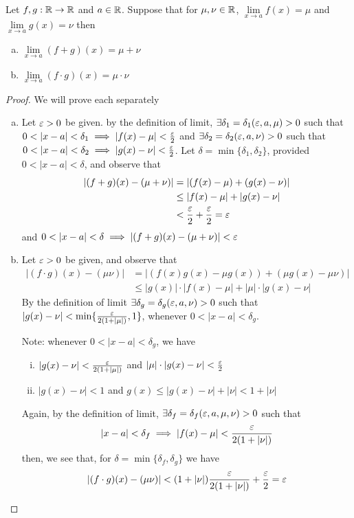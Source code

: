 \begin{theorem}
    Let $f, g:\mathbb R \rightarrow \mathbb R$ and $a \in \mathbb R$.
    Suppose that for $\mu, \nu \in \mathbb R$, $\lim\limits_{x \to a} f(x) = \mu$ and $\lim\limits_{x \to a} g(x) = \nu$ then \begin{enumerate}[(a)]
        \item $\lim\limits_{x \to a} (f+g)(x) = \mu + \nu$
        \item$\lim\limits_{x \to a} (f\cdot g)(x) = \mu \cdot \nu$
    \end{enumerate}
\end{theorem}
\begin{proof}
We will prove each separately
\begin{enumerate}[(a)]
    \item Let $\varepsilon > 0$ be given. by the definition of limit,  
    $\exists \delta_1 = \delta_1(\varepsilon, a, \mu) > 0$ such that 
    $0 < |x - a| < \delta_1 \implies |f(x) - \mu| < \frac{\varepsilon}{2}$ and 
    $\exists \delta_2 = \delta_2(\varepsilon, a, \nu) > 0$ such that 
    $0 < |x - a| < \delta_2 \implies |g(x) - \nu| < \frac{\varepsilon}{2}$.
    Let $\delta=\min\{\delta_1, \delta_2\}$, provided $0 < |x-a| < \delta$, and observe that
    \begin{align*}
        |(f+g)(x)-(\mu+\nu)| &= |(f(x)-\mu)+(g(x)-\nu)| \\
        &\leq |f(x)-\mu|+|g(x)-\nu| \\
        &< \frac{\varepsilon}{2} + \frac{\varepsilon}{2} = \varepsilon
    \end{align*}
    and $0 < |x-a| < \delta \implies |(f+g)(x)-(\mu+\nu)| < \varepsilon$
    \item Let $\varepsilon > 0$ be given, and observe that 
    \begin{align*}
        |(f\cdot g)(x)-(\mu\nu)| &= |(f(x)g(x)-\mu g(x))+(\mu g(x)-\mu\nu)| \\
        &\leq |g(x)|\cdot|f(x)-\mu|+|\mu|\cdot|g(x)-\nu| 
    \end{align*}
    By the definition of limit $\exists \delta_g=\delta_g(\varepsilon, a, \nu) > 0$ such that $|g(x) - \nu| < \min\{\frac{\varepsilon}{2(1+|\mu|)}, 1\}$, whenever $0 < |x-a| < \delta_g$.
    
    Note: whenever $0 < |x-a| < \delta_g$, we have
    \begin{enumerate}[(i)]
        \item $|g(x) - \nu| < \frac{\varepsilon}{2(1+|\mu|)}$ and $|\mu|\cdot|g(x)-\nu| < \frac{\varepsilon}{2}$
        \item $|g(x)-\nu| < 1$ and $g(x) \leq |g(x) - \nu| + |\nu| < 1 + |\nu|$
    \end{enumerate}
    Again, by the definition of limit, $\exists\delta_f=\delta_f(\varepsilon, a, \mu, \nu) > 0$ such that $$|x-a| < \delta_f \implies |f(x) - \mu| < \frac{\varepsilon}{2(1+|\nu|)}$$
    then, we see that, for $\delta = \min\{\delta_f, \delta_g\}$ we have $$|(f\cdot g)(x)-(\mu\nu)| < (1 + |\nu|)\frac{\varepsilon}{2(1 + |\nu|)} + \frac{\varepsilon}{2} = \varepsilon$$
\end{enumerate}
\end{proof}

